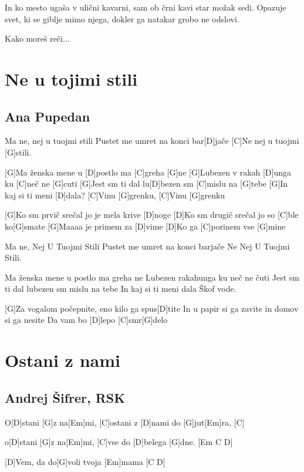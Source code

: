 \documentclass[a4paper,12pt]{article}
\begin{document}
\begin{multicols}{2}
\begin{guitar}
In ko mesto ugaša 
v ulični kavarni, 
sam ob črni kavi 
star možak sedi. 
Opazuje svet, 
ki se giblje mimo njega, 
dokler ga natakar 
grobo ne odslovi. 


Kako moreš reči...

\end{guitar}
\section{Ne u tojimi stili}
\subsection*{Ana Pupedan}
\begin{guitar}
[G]Ma ne, nej u tuojmi stili
Pustet me umret na konci bar[D]jače
[C]Ne nej u tuojmi [G]stili.


[G]Ma ženska mene u [D]postlo ma [C]greha [G]ne
[G]Lubezen v rakah [D]unga ku [C]neč ne [G]cuti
[G]Jest sm ti dal lu[D]bezen sm [C]mislu na [G]tebe
[G]In kaj si ti meni [D]dala?
[C]Vinu [G]grenku, [C]Vinu [G]grenku


[G]Ko sm prvič srečal jo je mela krive [D]noge
[D]Ko sm drugič srečal jo so [C]ble ko[G]smate
[G]Maaaa je primem za [D]vime
[D]Ko ga [C]porinem vse [G]mine


Ma ne, Nej U Tuojmi Stili
Pustet me umret na konci barjače
Ne Nej U Tuojmi Stili.


Ma ženska mene u postlo ma greha ne
Lubezen rakahunga ku neč ne čuti
Jest sm ti dal lubezen sm mislu na tebe
In kaj si ti meni dala
Škof vode.


[G]Za vogalom počepnite, eno kilo ga spus[D]tite
In u papir si ga zavite in domov si ga nesite
Da vam bo [D]lepo [C]smr[G]delo

\end{guitar}
\section{Ostani z nami}
\subsection*{Andrej Šifrer, RSK}
\begin{guitar}
[G Em C]        
  
O[D]stani [G]z na[Em]mi,  [C]ostani z [D]nami do [G]jut[Em]ra,  [C]

o[D]stani [G]z na[Em]mi,  [C]vse do [D]belega [G]dne. [Em C D]


[D]Vem, da do[G]voli tvoja [Em]mama [C D]


\end{guitar}
\end{multicols}
\end{document}
